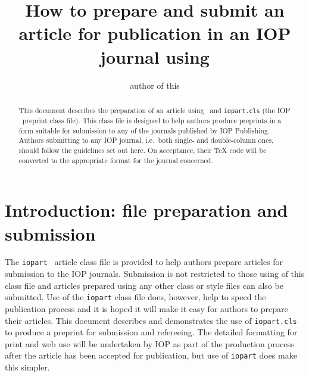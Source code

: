 \documentclass[12pt]{iopart}
\begin{document}
\title[Author guidelines for IOP journals in  \LaTeXe]{How to prepare and submit an article for 
publication in an IOP journal using \LaTeXe}

\author{author of this}

\address{IOP 
Publishing, Dirac
House, Temple Back, Bristol BS1 6BE, UK}
\begin{abstract}
This document describes the  preparation of an article using \LaTeXe\ and 
\verb"iopart.cls" (the IOP \LaTeXe\ preprint class file).
This class file is designed to help 
authors produce preprints in a form suitable for submission to any of the
journals published by IOP Publishing.
Authors submitting to any IOP journal, i.e.\ 
both single- and double-column ones, should follow the guidelines set out here. 
On acceptance, their TeX code will be converted to 
the appropriate format for the journal concerned.

\end{abstract}

\maketitle

\section{Introduction: file preparation and submission}
The \verb"iopart" \LaTeXe\ article class file is provided to help authors prepare articles for submission to the IOP journals. Submission is not restricted to those using of this class file and articles prepared using any other class or style files can also be submitted. Use of the \verb"iopart" class file does, however, help to speed the publication process and it is hoped it will make it easy for authors to prepare their articles. This document describes and demonstrates the use of \verb"iopart.cls" to produce a preprint for submission and refereeing. The detailed formatting for print and web use will be undertaken by IOP as part of the production process after the article has been accepted for publication, but use of \verb"iopart" does make this simpler.
\end{document}
